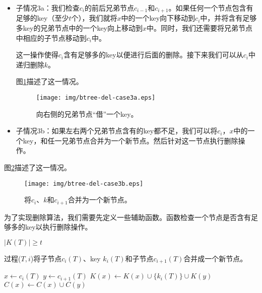 \documentclass[UTF8]{article}
\begin{document}
\begin{itemize}
\item 子情况3a：我们检查$c_i$的前后兄弟节点$c_{i-1}$和$c_{i+1}$。如果任何一个节点包含有足够的key（至少$t$个），我们就将$x$中的一个key向下移动到$c_i$中，并将含有足够多key的兄弟节点中的一个key向上移动到$x$中。同时，我们还需要将兄弟节点中相应的子节点移动到$c_i$中。

这一操作使得$c_i$含有足够多的key以便进行后面的删除。接下来我们可以从$c_i$中递归删除$k$。

图\ref{fig:btree-del-case3a}描述了这一情况。

\begin{figure}[htbp]
  \centering
    \texttt{[image: img/btree-del-case3a.eps]}
    \caption{向右侧的兄弟节点“借”一个key。}
    \label{fig:btree-del-case3a}
\end{figure}

\item 子情况3b：如果左右两个兄弟节点含有的key都不足，我们可以将$c_i$，$x$中的一个key，和任一兄弟节点合并为一个新节点。然后针对这一节点执行删除操作。
\end{itemize}

图\ref{fig:btree-del-case3b}描述了这一情况。

\begin{figure}[htbp]
  \centering
    \texttt{[image: img/btree-del-case3b.eps]}
    \caption{将$c_i$、$k$和$c_{i+1}$合并为一个新节点。}
    \label{fig:btree-del-case3b}
\end{figure}

为了实现删除算法，我们需要先定义一些辅助函数。函数检查一个节点是否含有足够多的key以执行删除操作。

\begin{algorithmic}[1]
  \State \Return $|K(T)| \ge t$
\EndFunction
\end{algorithmic}

过程($T, i$)将子节点$c_i(T)$、key $k_i(T)$和子节点$c_{i+1}(T)$合并成一个新节点。

\begin{algorithmic}[1]
 
  \State $x \gets c_i(T)$
  \State $y \gets c_{i+1}(T)$
  \State $K(x) \gets K(x) \cup \{k_i(T)\} \cup K(y)$
  \State $C(x) \gets C(x) \cup C(y)$
  \State {}
  \State {}
\EndProcedure
\end{algorithmic}
\end{document}
